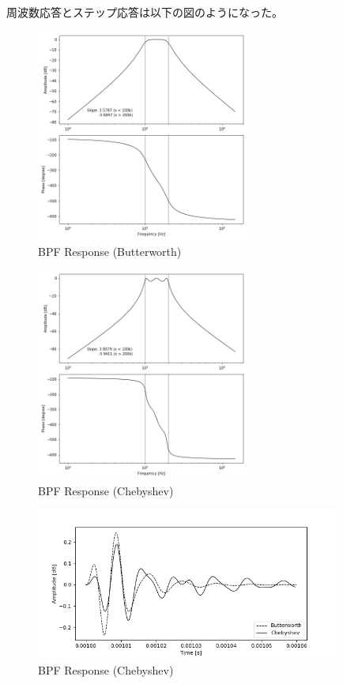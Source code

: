 \documentclass[a4j,dvipdfmx]{article}
\begin{document}
\begin{enumerate}[label={(\arabic*)}]
周波数応答とステップ応答は以下の図のようになった。

\begin{figure}[H]
    \begin{center}
     	\includegraphics[width=7cm]{BPF_B_f.png}
        \caption{BPF Response (Butterworth)}
    \end{center}
\end{figure}

\begin{figure}[H]
    \begin{center}
     	\includegraphics[width=7cm]{BPF_C_f.png}
        \caption{BPF Response (Chebyshev)}
    \end{center}
\end{figure}

\begin{figure}[H]
    \begin{center}
     	\includegraphics[width=10cm]{BPF_BC_s.png}
        \caption{BPF Response (Chebyshev)}
    \end{center}
\end{figure}


\end{enumerate}
\end{document}
